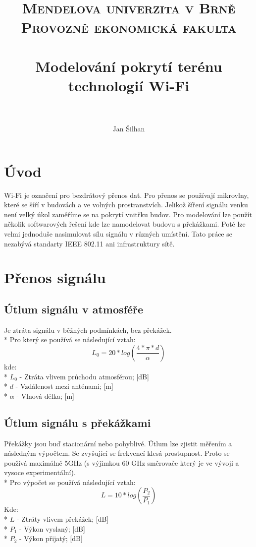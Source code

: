 \documentclass[paper=a4, fontsize=11pt]{scrartcl}
\date{\displaydate{date}}
\title{	
\normalfont \normalsize 
\textsc{Mendelova univerzita v Brně\\Provozně ekonomická fakulta} \\ [25pt] 
\horrule{0.5pt} \\[0.4cm] 
\huge Modelování pokrytí terénu technologií Wi-Fi \\ %
\horrule{2pt} \\[0.5cm] 
}
\author{Jan Šilhan} %
\date{\displaydate{date}}
\numberwithin{equation}{section}
\numberwithin{figure}{section}
\numberwithin{table}{section}
\begin{document}
\maketitle 

\newpage

\tableofcontents

\newpage


\section{Úvod}
Wi-Fi je označení pro bezdrátový přenos dat. Pro přenos se používají mikrovlny, které se šíří v budovách a ve volných prostranstvích. Jelikož šíření signálu venku není velký úkol zaměříme se na pokrytí vnitřku budov. 
Pro modelování lze použít několik softwarových řešení kde lze namodelovat budovu s překážkami. Poté lze velmi jednoduše nasimulovat sílu signálu v různých umístění. 
Tato práce se nezabývá standarty IEEE 802.11 ani infrastruktury sítě. 



\section{Přenos signálu}
	\subsection{Útlum signálu v atmosféře}
	Je ztráta signálu v běžných podmínkách, bez překážek. 
	\\*	
	Pro který se používá se následující vztah:
	\begin{equation}
		L_{0} = 20 * log \left(
			\frac{4*\pi*d}
			{\alpha}
			\right)
	\end{equation}
	kde:
	\\*
	$L_0$ - Ztráta vlivem průchodu atmosférou; [dB]
	\\*
	$d$ - Vzdálenost mezi anténami; [m]
	\\*
	$\alpha$ - Vlnová délka; [m]
	\subsection{Útlum signálu s překážkami}
	Překážky jsou buď stacionární nebo pohyblivé. 
	Útlum lze zjistit měřením a následným výpočtem. 
	Se zvyšující se frekvencí klesá prostupnost. 
	Proto se používá maximálně 5GHz 
	(s výjimkou 60 GHz směrovače který je ve vývoji a vysoce experimentální).
	\\*
	Pro výpočet se používá následující vztah:
	\begin{equation}
	L = 10 * log \left(
		\frac{P_{2}}
		{P_{1}}
		\right)
	\end{equation}
	Kde:
	\\*
	$L$ - Ztráty vlivem překážek; [dB]
	\\*
	$P_{1}$ - Výkon vyslaný; [dB]
	\\*
	$P_{2}$ - Výkon přijatý; [dB]
	\newpage
\end{document}
